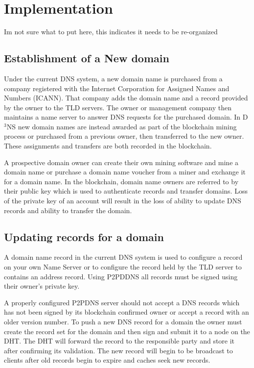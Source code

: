 \documentclass[11pt]{IEEEtran} %
\begin{document}
\section{Implementation}
Im not sure what to put here, this indicates it needs to be re-organized
\subsection{Establishment of a New domain}
Under the current DNS system, a new domain name is purchased from a company registered with the Internet Corporation for Assigned Names and Numbers (ICANN). That company adds the domain name and a record provided by the owner to the TLD servers. The owner or management company then maintains a name server to answer DNS requests for the purchased domain. In D$^{3}$NS new domain names are instead awarded as part of the blockchain mining process or purchased from a previous owner, then transferred to the new owner. These assignments and transfers are both recorded in the blockchain. 

A prospective domain owner can create their own mining software and mine a domain name or purchase a domain name voucher from a miner and exchange it for a domain name. In the blockchain, domain name owners are referred to by their public key which is used to authenticate records and transfer domains. Loss of the private key of an account will result in the loss of ability to update DNS records and ability to transfer the domain. 

\subsection{Updating records for a domain}
A domain name record in the current DNS system is used to configure a record on your own Name Server or to configure the record held by the TLD server to contains an address record. Using P2PDDNS all records must be signed using their owner's private key. 

A properly configured P2PDNS server should not accept a DNS records which has not been signed by its blockchain confirmed owner or accept a record with an older version number. To push a new DNS record for a domain the owner must create the record set for the domain and then sign and submit it to a node on the DHT. The DHT will forward the record to the responsible party and store it after confirming its validation. The new record will begin to be broadcast to clients after old records begin to expire and caches seek new records.
\end{document}
